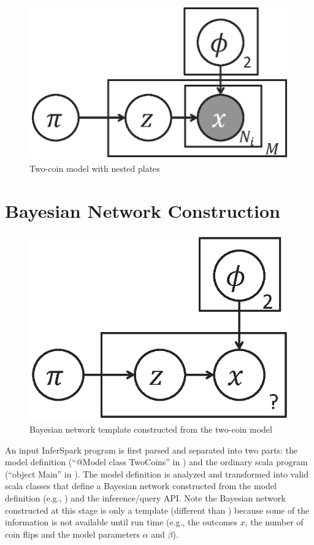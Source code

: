 \begin{figure}[th]
	\centering
	\includegraphics[scale=0.5, clip]{figs/two_coins_nestedplates}
	\caption{Two-coin model with nested plates}
	\label{fig:two_coins_nestedplates}
\end{figure}

\section{Bayesian Network Construction}

\begin{figure}[h]
\centering
\includegraphics[scale=0.5,clip]{figs/two_coins_bn1.eps}
\caption{Bayesian network template constructed from the two-coin model}
\label{fig:two_coins_bn1}
\end{figure}

An input InferSpark program is first parsed and separated into two parts: 
the model definition (``{\sf @Model} class TwoCoins'' in 
) and
the ordinary scala program (``{\sf object Main}'' in
). The model definition is analyzed and
transformed into valid scala classes that define a Bayesian
network constructed from the model definition 
(e.g., ) and the inference/query API.
Note the Bayesian network
constructed at this stage is only a template (different than 
) because some of the information is not available 
until run time (e.g., the outcomes $x$, the number of coin flips 
and the model parameters $\alpha$ and $\beta$). 

